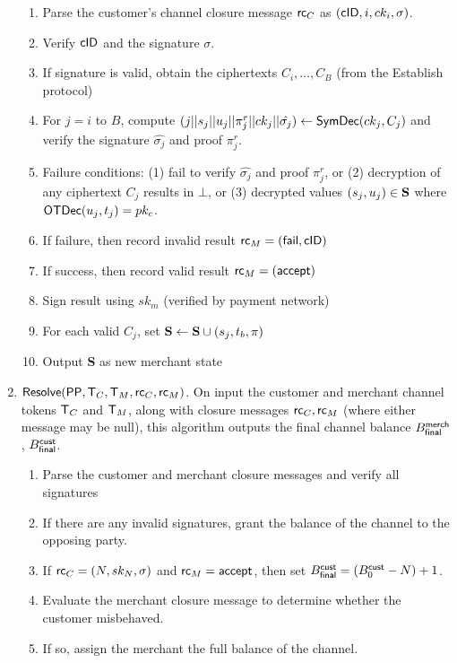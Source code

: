 \documentclass[11pt]{report}
\begin{document}
\begin{enumerate}
\begin{enumerate}
\item Parse the customer's channel closure message ${\sf rc}_{C}$ as $({\sf cID}, i, ck_i, \sigma)$.
\item Verify ${\sf cID}$ and the signature $\sigma$.
\item If signature is valid, obtain the ciphertexts $C_i, \dots, C_{B}$ (from the {\sf Establish} protocol)
\item For $j = i$ to $B$, compute $(j||s_j||u_j || \pi_{j}^r || ck_j || \hat{\sigma_j}) \leftarrow {\sf SymDec}(ck_j, C_j)$ and verify the signature $\hat{\sigma_j}$ and proof ${\pi_j^r}$.
\item Failure conditions: (1) fail to verify $\hat{\sigma_j}$ and proof ${\pi_j^r}$, or (2) decryption of any ciphertext $C_j$ results in $\bot$, or (3) decrypted values $(s_j, u_j) \in {\bf S}$ where ${\sf OTDec}(u_j, t_j) = pk_c$.
\item If failure, then record invalid result ${\sf rc}_{M} = ({\sf fail}, {\sf cID})$
\item If success, then record valid result ${\sf rc}_{M} = ({\sf accept})$ 
\item Sign result using $sk_m$ (verified by payment network)
\item For each valid $C_j$, set ${\bf S} \leftarrow {\bf S} \cup (s_j, t_b, \pi)$ 
\item Output {\bf S} as new merchant state
\end{enumerate}

\item ${\sf Resolve}({\sf PP}, {\sf T}_{C}, {\sf T}_{M}, {\sf rc}_{C}, {\sf rc}_{M})$. On input the customer and merchant channel tokens ${\sf T}_{C}$ and ${\sf T}_{M}$, along with closure messages ${\sf rc}_{C}, {\sf rc}_{M}$ (where either message may be {\sf null}), this algorithm outputs the final channel balance ${B_{\sf final}^{\sf merch}}$, ${B_{\sf final}^{\sf cust}}$.
\begin{enumerate}
\item Parse the customer and merchant closure messages and verify all signatures
\item If there are any invalid signatures, grant the balance of the channel to the opposing party.
\item If ${\sf rc}_{C} = (N, sk_{N}, \sigma)$ and ${\sf rc}_{M} = {\sf accept}$, then set ${B_{\sf final}^{\sf cust}} = ({B_{0}^{\sf cust}} - N) + 1$.
\item Evaluate the merchant closure message to determine whether the customer misbehaved. %
\item If so, assign the merchant the full balance of the channel.
\end{enumerate}

\end{enumerate}
\end{document}

